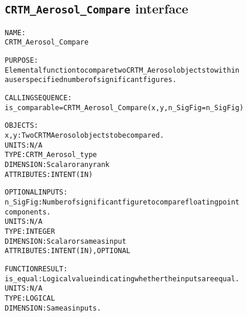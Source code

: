 \subsection{\texttt{CRTM\_Aerosol\_Compare} interface}
  \label{sec:CRTM_Aerosol_Compare_interface}
  \begin{alltt}
  NAME:
        CRTM_Aerosol_Compare
 
  PURPOSE:
        Elemental function to compare two CRTM_Aerosol objects to within
        a user specified number of significant figures.
 
  CALLING SEQUENCE:
        is_comparable = CRTM_Aerosol_Compare( x, y, n_SigFig=n_SigFig )
 
  OBJECTS:
        x, y:          Two CRTM Aerosol objects to be compared.
                       UNITS:      N/A
                       TYPE:       CRTM_Aerosol_type
                       DIMENSION:  Scalar or any rank
                       ATTRIBUTES: INTENT(IN)
 
  OPTIONAL INPUTS:
        n_SigFig:      Number of significant figure to compare floating point
                       components.
                       UNITS:      N/A
                       TYPE:       INTEGER
                       DIMENSION:  Scalar or same as input
                       ATTRIBUTES: INTENT(IN), OPTIONAL
 
  FUNCTION RESULT:
        is_equal:      Logical value indicating whether the inputs are equal.
                       UNITS:      N/A
                       TYPE:       LOGICAL
                       DIMENSION:  Same as inputs.
  \end{alltt}
